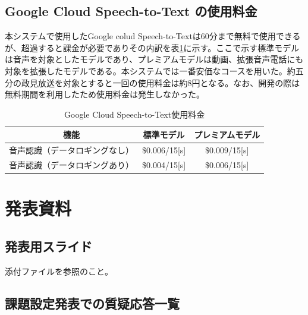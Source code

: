 \documentclass[a4paper,12pt]{jsarticle}
\begin{document}
\subsection{Google Cloud Speech-to-Text の使用料金}

本システムで使用したGoogle colud Speech-to-Textは60分まで無料で使用できるが、超過すると課金が必要でありその内訳を表\ref{tab:GCS2T}に示す\cite{GCS2T}。ここで示す標準モデルは音声を対象としたモデルであり、プレミアムモデルは動画、拡張音声電話にも対象を拡張したモデルである。本システムでは一番安価なコースを用いた。約五分の政見放送を対象とすると一回の使用料金は約8円となる。なお、開発の際は無料期間を利用したため使用料金は発生しなかった。

\begin{table}[H]
	\begin{center}
		\begin{tabular}{c|c|c}
			機能&標準モデル&プレミアムモデル\\ \hline
			音声認識（データロギングなし）&\$0.006/15[s]&\$0.009/15[s]\\
			音声認識（データロギングあり）&\$0.004/15[s]&\$0.006/15[s]
		\end{tabular}
		\caption{Google Cloud Speech-to-Text使用料金}
		\label{tab:GCS2T}
	\end{center}
\end{table}

\section{発表資料}
\subsection{発表用スライド}
添付ファイルを参照のこと。

\subsection{課題設定発表での質疑応答一覧}
\end{document}
